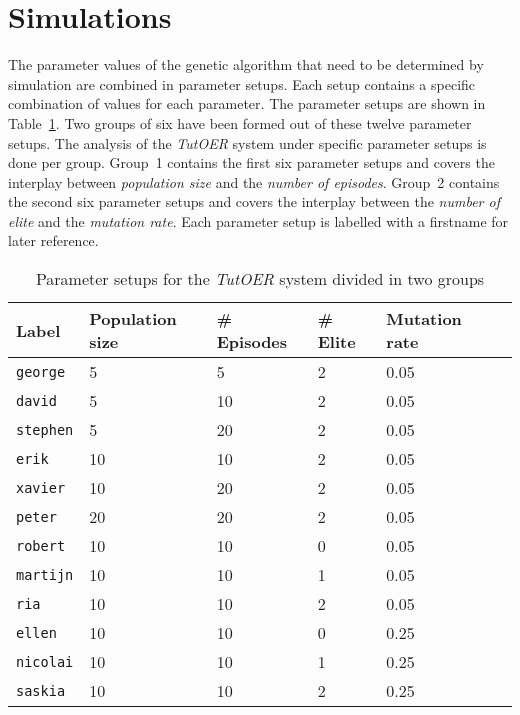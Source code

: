 \section{Simulations}
\label{sec:simulations_simulations}
The parameter values of the genetic algorithm that need to be determined by
simulation are combined in parameter setups. Each setup contains a specific
combination of values for each parameter. The parameter setups are shown in
Table~\ref{tab:simulation_setups}. Two groups of six have been formed out of
these twelve parameter setups. The analysis of the \emph{TutOER} system under
specific parameter setups is done per group. Group~1 contains the first six
parameter setups and covers the interplay between \emph{population size} and
the \emph{number of episodes}. Group~2 contains the second six parameter setups
and covers the interplay between the \emph{number of elite} and the
\emph{mutation rate}. Each parameter setup is labelled with a firstname for
later reference.\\
\begin{table}[h!]
	\centering
	\caption{Parameter setups for the \emph{TutOER} system divided in two groups}
	\label{tab:simulation_setups}
	\begin{tabular}{llllll}\hline
		\textbf{Label} & \textbf{Population size} & \textbf{\# Episodes}
		& \textbf{\# Elite} & \textbf{Mutation rate} \\\hline
		\texttt{george} & 5 & 5 & 2 & 0.05 \\
		\texttt{david} & 5 & 10 & 2 & 0.05 \\
		\texttt{stephen} & 5 & 20 & 2 & 0.05 \\
		\texttt{erik} & 10 & 10 & 2 & 0.05 \\
		\texttt{xavier} & 10 & 20 & 2 & 0.05 \\
		\texttt{peter} & 20 & 20 & 2 & 0.05 \\\hdashline
		\texttt{robert} & 10 & 10 & 0 & 0.05 \\
		\texttt{martijn} & 10 & 10 & 1 & 0.05 \\
		\texttt{ria} & 10 & 10 & 2 & 0.05 \\
		\texttt{ellen} & 10 & 10 & 0 & 0.25 \\
		\texttt{nicolai} & 10 & 10 & 1 & 0.25 \\
		\texttt{saskia} & 10 & 10 & 2 & 0.25 \\
	\end{tabular}
\end{table}\\
